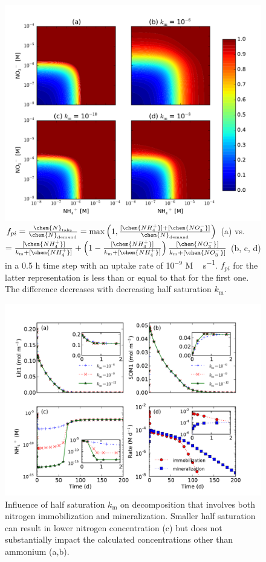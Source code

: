 \documentclass[gmd, manuscript]{copernicus}
\begin{document}
\begin{figure}[t]
\includegraphics[width=12cm]{../figs/fig05/uptakef.pdf}
\caption{
$f_{pi}=\frac{\chem{N}_\text{take}}{\chem{N}_\text{demand}}=\max\left(1,\frac{[\chem{NH_4^+}]+[\chem{NO_3^-}]}{\chem{N}_\text{demand}}\right)$
(a) vs.
$=\frac{[\chem{NH_4^+}]}{k_\text{m}+[\chem{NH_4^+}]}+\left(1-\frac{[\chem{NH_4^+}]}{k_\text{m}+[\chem{NH_4^+}]}\right)\frac{[\chem{NO_3^-}]}{k_\text{m}+[\chem{NO_3^-}]}$
(b, c, d) in a 0.5 h time step with an uptake rate of 10$^{-9}$
\unit{M\,s^{-1}}. $f_{pi}$ for the latter representation
is less than or equal to that for the first one. The difference decreases with decreasing
half saturation $k_\text{m}$.}
\label{fig:demanddistribution}
\end{figure}

\begin{figure}[t]
\includegraphics[width=15cm]{../figs/fig09/figdecomp.pdf}
\caption{Influence of half saturation $k_\text{m}$ on decomposition that involves both
nitrogen immobilization and mineralization. Smaller half saturation can result
in lower nitrogen concentration (c) but does not substantially impact the
calculated concentrations other than ammonium (a,b).}
\label{fig:decomp}
\end{figure}
\end{document}
